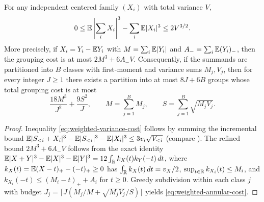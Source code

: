 \begin{lemma}\label{lem:weighted-grouping}
For any independent centered family $(X_i)$ with total variance $V$,
\begin{equation}\label{eq:weighted-variance-cost}
 0\le\mathbb E\left|\sum_i X_i\right|^3-\sum_i\mathbb E|X_i|^3\le2V^{3/2}.
\end{equation}
More precisely, if $X_i=Y_i-\mathbb E Y_i$ with $M=\sum_i\mathbb E|Y_i|$ and
$A_-=\sum_i\mathbb E(Y_i)_-$, then the grouping cost is at most $2M^3+6A_-V$.
Consequently, if the summands are partitioned into $B$ classes with first-moment
and variance sums $M_j,V_j$, then for every integer $J\ge1$ there exists a
partition into at most $8J+6B$ groups whose total grouping cost is at most
\begin{equation}\label{eq:weighted-annular-cost}
 \frac{18M^3}{J^2}+\frac{9S^2}{J},
 \qquad M=\sum_{j=1}^B M_j,\qquad S=\sum_{j=1}^B\sqrt{M_jV_j}.
\end{equation}
\end{lemma}
\begin{proof}
Inequality \eqref{eq:weighted-variance-cost} follows by summing the
incremental bound $\mathbb E|S_{<i}+X_i|^3-\mathbb E|S_{<i}|^3-\mathbb E|X_i|^3\le3v_i\sqrt{V_{<i}}$
(compare \citet[eq.~(5)]{Pinelis2013}). The refined bound $2M^3+6A_-V$
follows from the exact identity
$\mathbb E|X+Y|^3-\mathbb E|X|^3-\mathbb E|Y|^3=12\int_\mathbb R k_X(t)k_Y(-t)\,dt$, where
$k_X(t)=\mathbb E(X-t)_+-(-t)_+\ge0$ has $\int_\mathbb R k_X(t)\,dt=v_X/2$,
$\sup_{t\in\mathbb R}k_{X_i}(t)\le M_i$, and $k_{X_i}(-t)\le(M_i-t)_++A_i$ for
$t\ge0$. Greedy subdivision within each class $j$ with budget
$J_j=\lceil J(M_j/M+\sqrt{M_jV_j}/S)\rceil$ yields \eqref{eq:weighted-annular-cost}.
\end{proof}

